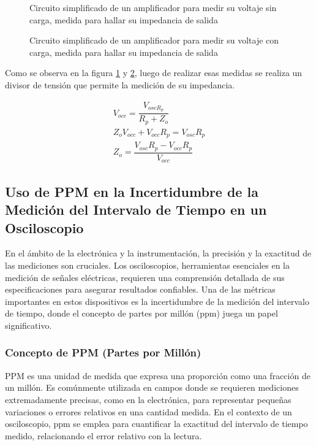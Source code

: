 \begin{figure}[H]
    
    \caption{Circuito simplificado de un amplificador para medir su voltaje sin carga, medida para hallar su impedancia de salida}
    \label{fig:zout_amp1}
\end{figure}

\begin{figure}[H]
    \centering
    
    \caption{Circuito simplificado de un amplificador para medir su voltaje con carga, medida para hallar su impedancia de salida}
    \label{fig:zout_amp2}
\end{figure}

Como se observa en la figura \ref{fig:zout_amp1} y \ref{fig:zout_amp2}, luego de realizar esas medidas se realiza un divisor de tensión que permite la medición de su impedancia.

\begin{gather}
    V_{occ}=\dfrac{V_{oscR_p}}{R_p + Z_o} \nonumber \\[0.2cm]
    Z_oV_{occ} + V_{occ}R_p=V_{osc}R_p \nonumber \\[0.2cm]
    Z_o= \dfrac{V_{osc}R_p - V_{occ}R_p}{V_{occ}} \label{eqn:zo}
\end{gather}


\subsection{Uso de PPM en la Incertidumbre de la Medición del Intervalo de Tiempo en un Osciloscopio}

En el ámbito de la electrónica y la instrumentación, la precisión y la exactitud de las mediciones son cruciales. Los osciloscopios, herramientas esenciales en la medición de señales eléctricas, requieren una comprensión detallada de sus especificaciones para asegurar resultados confiables. Una de las métricas importantes en estos dispositivos es la incertidumbre de la medición del intervalo de tiempo, donde el concepto de partes por millón (ppm) juega un papel significativo.

\subsubsection{Concepto de PPM (Partes por Millón)}

PPM es una unidad de medida que expresa una proporción como una fracción de un millón. Es comúnmente utilizada en campos donde se requieren mediciones extremadamente precisas, como en la electrónica, para representar pequeñas variaciones o errores relativos en una cantidad medida. En el contexto de un osciloscopio, ppm se emplea para cuantificar la exactitud del intervalo de tiempo medido, relacionando el error relativo con la lectura.

